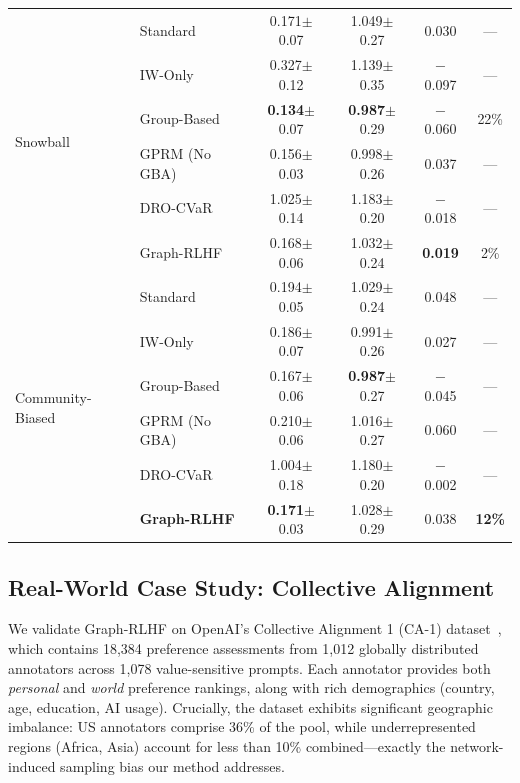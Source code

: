 \documentclass{article}
\theoremstyle{plain}
\theoremstyle{definition}
\theoremstyle{remark}
\begin{document}
\begin{table}[t]
\begin{tabular}{llcccc}
\midrule
\multirow{6}{*}{Snowball}
& \cellcolor{neutralgray}Standard & \cellcolor{neutralgray}0.171{\tiny$\pm$0.07} & \cellcolor{neutralgray}1.049{\tiny$\pm$0.27} & \cellcolor{neutralgray}0.030 & \cellcolor{neutralgray}--- \\
& IW-Only & 0.327{\tiny$\pm$0.12} & 1.139{\tiny$\pm$0.35} & $-$0.097 & --- \\
& \cellcolor{bestgreen}Group-Based & \cellcolor{bestgreen}\textbf{0.134}{\tiny$\pm$0.07} & \cellcolor{bestgreen}\textbf{0.987}{\tiny$\pm$0.29} & $-$0.060 & \cellcolor{bestgreen}22\% \\
& GPRM (No GBA) & 0.156{\tiny$\pm$0.03} & 0.998{\tiny$\pm$0.26} & 0.037 & --- \\
& DRO-CVaR & 1.025{\tiny$\pm$0.14} & 1.183{\tiny$\pm$0.20} & $-$0.018 & --- \\
& \cellcolor{goodblue}Graph-RLHF & \cellcolor{goodblue}0.168{\tiny$\pm$0.06} & \cellcolor{goodblue}1.032{\tiny$\pm$0.24} & \cellcolor{bestgreen}\textbf{0.019} & \cellcolor{goodblue}2\% \\
\midrule
\multirow{6}{*}{Community-Biased}
& \cellcolor{neutralgray}Standard & \cellcolor{neutralgray}0.194{\tiny$\pm$0.05} & \cellcolor{neutralgray}1.029{\tiny$\pm$0.24} & \cellcolor{neutralgray}0.048 & \cellcolor{neutralgray}--- \\
& IW-Only & 0.186{\tiny$\pm$0.07} & 0.991{\tiny$\pm$0.26} & 0.027 & --- \\
& Group-Based & 0.167{\tiny$\pm$0.06} & \cellcolor{bestgreen}\textbf{0.987}{\tiny$\pm$0.27} & $-$0.045 & --- \\
& GPRM (No GBA) & 0.210{\tiny$\pm$0.06} & 1.016{\tiny$\pm$0.27} & 0.060 & --- \\
& DRO-CVaR & 1.004{\tiny$\pm$0.18} & 1.180{\tiny$\pm$0.20} & $-$0.002 & --- \\
& \cellcolor{goodblue}\textbf{Graph-RLHF} & \cellcolor{bestgreen}\textbf{0.171}{\tiny$\pm$0.03} & \cellcolor{goodblue}1.028{\tiny$\pm$0.29} & \cellcolor{goodblue}0.038 & \cellcolor{bestgreen}\textbf{12\%} \\
\bottomrule
\end{tabular}
\end{table}

\subsection{Real-World Case Study: Collective Alignment}
\label{subsec:exp-ca1}

We validate Graph-RLHF on OpenAI's Collective Alignment 1 (CA-1) dataset~\citep{openai2025ca1}, which contains 18,384 preference assessments from 1,012 globally distributed annotators across 1,078 value-sensitive prompts. Each annotator provides both \textit{personal} and \textit{world} preference rankings, along with rich demographics (country, age, education, AI usage). Crucially, the dataset exhibits significant geographic imbalance: US annotators comprise 36\% of the pool, while underrepresented regions (Africa, Asia) account for less than 10\% combined---exactly the network-induced sampling bias our method addresses.
\end{document}
